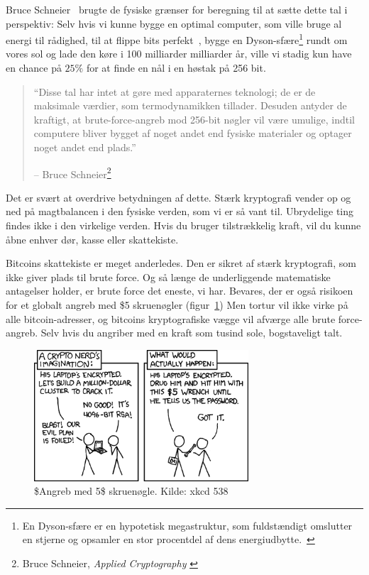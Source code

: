 \documentclass[paper=6in:9in,pagesize=pdftex,
               headinclude=on,footinclude=on,12pt]{scrbook}
\begin{document}
Bruce Schneier~\cite{web:schneier} brugte de fysiske grænser for beregning til at sætte dette tal i perspektiv: Selv hvis vi kunne bygge en optimal computer, som ville bruge al energi til rådighed, til at flippe bits perfekt~\cite{wiki:landauer}, bygge en Dyson-sfære\footnote{En Dyson-sfære er en hypotetisk megastruktur, som fuldstændigt omslutter en stjerne og opsamler en stor procentdel af dens energiudbytte.~\cite{wiki:dyson}} rundt om vores sol og lade den køre i 100 milliarder milliarder år, ville vi stadig kun have en chance på $25\%$ for at finde en nål i en høstak på 256 bit.\begin{quotation}\begin{samepage} \enquote{Disse tal har intet at gøre med apparaternes teknologi; de er de maksimale værdier, som termodynamikken tillader. Desuden antyder de kraftigt, at brute-force-angreb mod 256-bit nøgler vil være umulige, indtil computere bliver bygget af noget andet end fysiske materialer og optager noget andet end plads.} \begin{flushright} -- Bruce Schneier\footnote{Bruce Schneier, \textit{Applied Cryptography} \cite{bruce-schneier}}
\end{flushright}\end{samepage}\end{quotation}

Det er svært at overdrive betydningen af dette. Stærk kryptografi vender op og ned på magtbalancen i den fysiske verden, som vi er så vant til. Ubrydelige ting findes ikke i den virkelige verden. Hvis du bruger tilstrækkelig kraft, vil du kunne åbne enhver dør, kasse eller skattekiste.

Bitcoins skattekiste er meget anderledes. Den er sikret af stærk kryptografi, som ikke giver plads til brute force. Og så længe de underliggende matematiske antagelser holder, er brute force det eneste, vi har. Bevares, der er også risikoen for et globalt angreb med \$5 skruenøgler (figur~\ref{fig:xkcd-538}) Men tortur vil ikke virke på alle bitcoin-adresser, og bitcoins kryptografiske vægge vil afværge alle brute force-angreb. Selv hvis du angriber med en kraft som tusind sole, bogstaveligt talt.\begin{figure}
  \centering
  \includegraphics[width=8cm]{assets/images/xkcd-538.png}
  \caption{\$Angreb med 5\$ skruenøgle. Kilde: xkcd 538}
  \label{fig:xkcd-538}
\end{figure}
\end{document}
